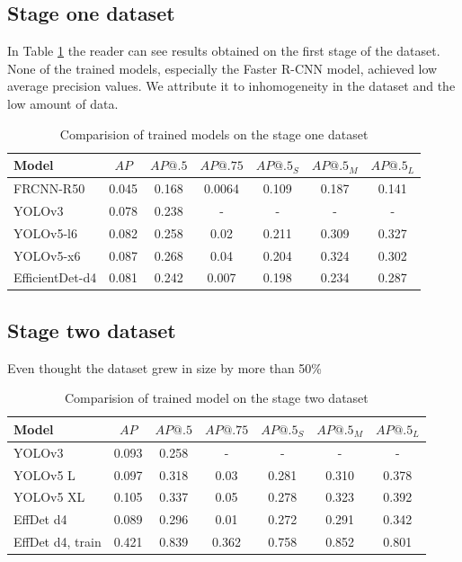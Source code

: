 \subsection{Stage one dataset}
In Table \ref{tab:model_results:stage_one} the reader can see results obtained on the first stage of the dataset. None of the trained models, especially the Faster R-CNN model, achieved low average precision values. We attribute it to inhomogeneity in the dataset and the low amount of data.
\begin{table}[H]
    \centering
    \begin{tabular}{|l|c|c|c|c|c|c|}
        \hline
        Model           & $AP$  & $AP@.5$ & $AP@.75$ & $AP@.5_S$ & $AP@.5_M$ & $AP@.5_L$ \\ \hline
        FRCNN-R50       & 0.045 & 0.168   & 0.0064   & 0.109     & 0.187     & 0.141     \\ \hline
        YOLOv3          & 0.078 & 0.238   & -        & -         & -         & -         \\ \hline
        YOLOv5-l6       & 0.082 & 0.258   & 0.02     & 0.211     & 0.309     & 0.327     \\ \hline
        YOLOv5-x6       & 0.087 & 0.268   & 0.04     & 0.204     & 0.324     & 0.302     \\ \hline
        EfficientDet-d4 & 0.081 & 0.242   & 0.007    & 0.198     & 0.234     & 0.287     \\ \hline
    \end{tabular}
    \caption{Comparision of trained models on the stage one dataset}
    \label{tab:model_results:stage_one}
\end{table}

\subsection{Stage two dataset}
Even thought the dataset grew in size by more than 50\%
\begin{table}[H]
    \centering
    \begin{tabular}{|l|c|c|c|c|c|c|}
        \hline
        Model            & $AP$  & $AP@.5$ & $AP@.75$ & $AP@.5_S$ & $AP@.5_M$ & $AP@.5_L$ \\ \hline
        YOLOv3           & 0.093 & 0.258   & -        & -         & -         & -         \\ \hline
        YOLOv5 L         & 0.097 & 0.318   & 0.03     & 0.281     & 0.310     & 0.378     \\ \hline
        YOLOv5 XL        & 0.105 & 0.337   & 0.05     & 0.278     & 0.323     & 0.392     \\ \hline
        EffDet d4        & 0.089 & 0.296   & 0.01     & 0.272     & 0.291     & 0.342     \\ \hline
        EffDet d4, train & 0.421 & 0.839   & 0.362    & 0.758     & 0.852     & 0.801     \\ \hline
    \end{tabular}
    \caption{Comparision of trained model on the stage two dataset}
    \label{tab:model_results:stage_two}
\end{table}

